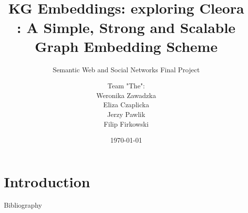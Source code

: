\documentclass{clbeamer2024}
\title{\\[2\baselineskip]KG Embeddings: exploring Cleora \cite{rychalska2021cleorasimplestrongscalable}: A Simple, Strong and Scalable Graph Embedding Scheme}
\subtitle{Semantic Web and Social Networks Final Project}
\author{
    \begin{tabular}{c}
        Team "The": \\[0.2cm]
        Weronika Zawadzka \\ 
        Eliza Czaplicka \\ 
        Jerzy Pawlik \\ 
        Filip Firkowski
    \end{tabular}
}
\date{\today}
\begin{document}
\setcounter{framenumber}{-1}
\frame{\titlepage}

\section{Introduction}






\begin{frame}{Bibliography}
{\raggedright\sloppy\small}
\end{frame}
\end{document}
